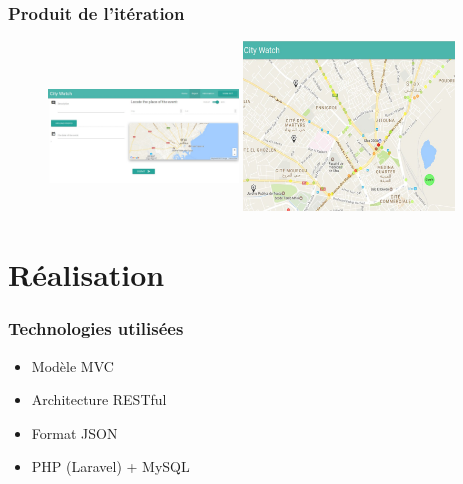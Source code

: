 \documentclass{beamer}
\begin{document}
\begin{frame}
    \frametitle{Produit de l'itération}
    \begin{figure}
        \includegraphics[width=0.45\textwidth,height=4cm]{./figures/sprint2-rapport-screenshot1}
        \includegraphics[width=0.5\textwidth]{./figures/sprint2-dashboard-screenshot2}
    \end{figure}
\end{frame}

\section{Réalisation}

\begin{frame}
    \frametitle{Technologies utilisées}
    \begin{itemize}
        \item Modèle MVC
        \item Architecture RESTful
        \item Format JSON
        \item PHP (Laravel) + MySQL
    \end{itemize}
\end{frame}
\end{document}
